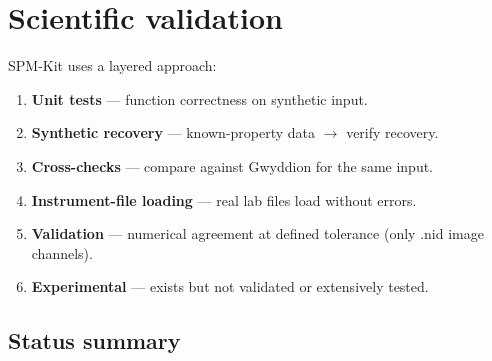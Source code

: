 \documentclass[a4paper,11pt]{article}
\begin{document}
\section{Scientific validation}
\label{sec:validation}

SPM-Kit uses a layered approach:

\begin{enumerate}[nosep]
  \item \textbf{Unit tests} --- function correctness on synthetic input.
  \item \textbf{Synthetic recovery} --- known-property data $\rightarrow$ verify recovery.
  \item \textbf{Cross-checks} --- compare against Gwyddion for the same input.
  \item \textbf{Instrument-file loading} --- real lab files load without errors.
  \item \textbf{Validation} --- numerical agreement at defined tolerance (only .nid image channels).
  \item \textbf{Experimental} --- exists but not validated or extensively tested.
\end{enumerate}

\subsection{Status summary}
\end{document}
